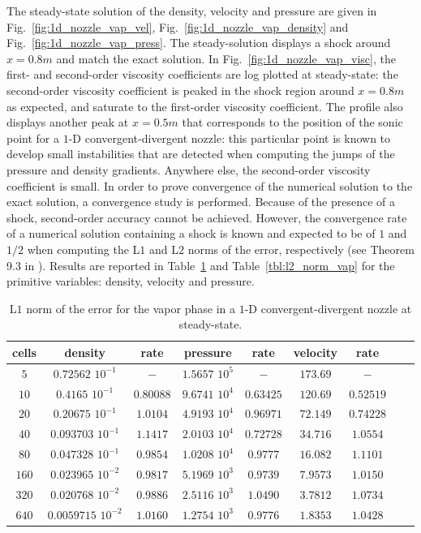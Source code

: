 \documentclass[preprint,10pt]{elsarticle}
\newcommand{\fig}[1]{Fig.~\ref{#1}}                      %
\newcommand{\tbl}[1]{Table~\ref{#1}}                     %
\begin{document}
The steady-state solution of the density, velocity and pressure are given in \fig{fig:1d_nozzle_vap_vel}, \fig{fig:1d_nozzle_vap_density} and \fig{fig:1d_nozzle_vap_press}. The steady-solution displays a shock around $x=0.8m$ and match the exact solution. In \fig{fig:1d_nozzle_vap_visc}, the first- and second-order viscosity coefficients are log plotted at steady-state: the second-order viscosity coefficient is peaked in the shock region around $x=0.8m$ as expected, and saturate to the first-order viscosity coefficient. The profile also displays another peak at $x=0.5m$ that corresponds to the position of the sonic point for a $1$-D convergent-divergent nozzle: this particular point is known to develop small instabilities that are detected when computing the jumps of the pressure and density gradients. Anywhere else, the second-order viscosity coefficient is small. In order to prove convergence of the numerical solution to the exact solution, a convergence study is performed. Because of the presence of a shock, second-order accuracy cannot be achieved. However, the convergence rate of a numerical solution containing a shock  is known and expected to be of $1$ and $1/2$ when computing the L$1$ and L$2$ norms of the error, respectively (see Theorem 9.3 in \cite{convergence_book}). Results are reported in \tbl{tbl:l1_norm_vap} and \tbl{tbl:l2_norm_vap} for the primitive variables: density, velocity and pressure.
\begin{table}[H]
\begin{center}
 \caption{\label{tbl:l1_norm_vap} L$1$ norm of the error for the vapor phase in a $1$-D convergent-divergent nozzle at steady-state.}
 \begin{tabular}{|c|c|c|c|c|c|c|c|c|}
 \hline
   cells & density & rate & pressure & rate & velocity & rate \\
 \hline
$5$ &   $0.72562$ $10^{-1}$ & $-$ & $1.5657$ $10^{5}$ & $-$ & $173.69$                   & $-$\\
  \hline
$10$  &  $0.4165$ $10^{-1}$ & $0.80088$ & $9.6741$ $10^{4}$ & $0.63425$ & $120.69$ & $0.52519$\\
   \hline
$20$ & $0.20675$ $10^{-1}$ & $1.0104$ & $4.9193$ $10^{4}$ & $0.96971$ & $72.149$& $0.74228$\\
 \hline
$40$ & $0.093703$ $10^{-1}$ & $1.1417$ & $2.0103$ $10^{4}$ & $0.72728$ & $34.716$& $1.0554$\\
 \hline
$80$ & $0.047328$ $10^{-1}$ & $0.9854$ & $1.0208$ $10^{4}$ & $0.9777$ & $16.082$& $1.1101$\\
 \hline
$160$&$0.023965$ $10^{-2}$ & $0.9817$ & $5.1969$ $10^{3}$ & $0.9739$ & $7.9573$& $1.0150$\\
 \hline
$320$&$0.020768$ $10^{-2}$& $0.9886$ & $2.5116$ $10^{3}$ & $1.0490$ & $3.7812$& $1.0734$\\
 \hline
 $640$&$0.0059715$ $10^{-2}$& $1.0160$ & $1.2754$ $10^{3}$ & $0.9776$ & $1.8353$& $1.0428$\\
 \hline
\end{tabular}
\end{center}
\nonumber
\end{table}
\end{document}
